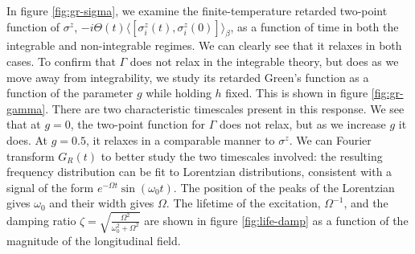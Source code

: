 In figure \ref{fig:gr-sigma}, we examine the finite-temperature retarded two-point function of $\sigma^z$, $-i\Theta(t)\langle[\sigma_i^z (t),\sigma_i^z(0)]\rangle_\beta$, as a function of time in both the integrable and non-integrable regimes. We can clearly see that it relaxes in both cases. To confirm that $\Gamma$ does not relax in the integrable theory, but does as we move away from integrability, we study its retarded Green's function as a function of the parameter $g$ while holding $h$ fixed. This is shown in figure \ref{fig:gr-gamma}. There are two characteristic timescales present in this response. We see that at $g=0$, the two-point function for $\Gamma$ does not relax, but as we increase $g$ it does. At $g=0.5$, it relaxes in a comparable manner to $\sigma^z$. We can Fourier transform $G_R(t)$ to better study the two timescales involved: the resulting frequency distribution can be fit to Lorentzian distributions, consistent with a signal of the form $e^{-\Omega t} \sin(\omega_0 t)$. The position of the peaks of the Lorentzian gives $\omega_0$ and their width gives $\Omega$. The lifetime of the excitation, $\Omega^{-1}$, and the damping ratio $\zeta=\sqrt{\frac{\Omega^2}{\omega_0^2+\Omega^2}}$ are shown in figure \ref{fig:life-damp} as a function of the magnitude of the longitudinal field. 
